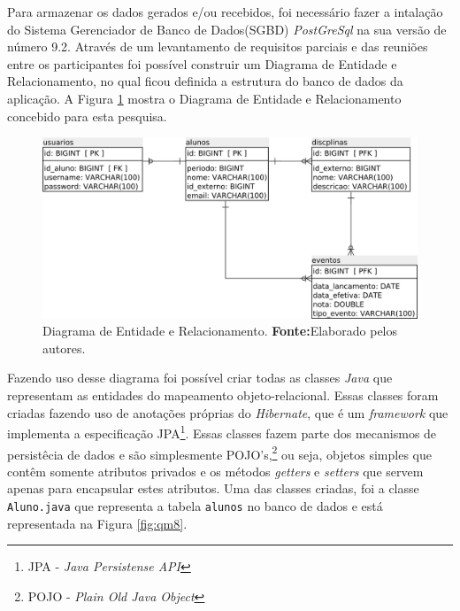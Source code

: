		\par Para armazenar os dados gerados e/ou recebidos, foi necessário fazer a
	intalação do Sistema Gerenciador de Banco de Dados(SGBD) \textit{PostGreSql} na
	sua versão de número 9.2. Através de um levantamento de requisitos parciais e das
	reuniões entre os participantes foi possível construir um Diagrama de Entidade
	e Relacionamento, no qual ficou definida a estrutura do banco de dados da
	aplicação. A Figura \ref{fig:qm7} mostra o Diagrama de Entidade e
	Relacionamento concebido para esta pesquisa.

		\begin{figure}[h!]
			\centerline{\includegraphics[scale=0.4]{./imagens/2_q_metodologico/qm7.png}}
			\caption[Diagrama de Entidade e Relacionamento]{Diagrama de Entidade e
			Relacionamento.
			\textbf{Fonte:}Elaborado pelos autores.}
			\label{fig:qm7}
		\end{figure}

		\par Fazendo uso desse diagrama foi possível criar todas as classes 
	\textit{Java} que representam as entidades do mapeamento objeto-relacional. 
	Essas classes foram criadas fazendo uso de anotações próprias do
	\textit{Hibernate}, que é um \textit{framework} que implementa a especificação
	JPA\footnote{JPA - \textit{Java Persistense API}}. Essas classes fazem parte
	dos mecanismos de persistêcia de dados e são simplesmente POJO's,\footnote{POJO
	- \textit{Plain Old Java Object }} ou seja, objetos simples que contêm somente
	atributos privados e os métodos \textit{getters} e \textit{setters} que servem
	apenas para encapsular estes atributos. Uma das classes criadas, foi a classe
	\texttt{Aluno.java} que representa a tabela \texttt{alunos} no banco de dados e
	está representada na Figura \ref{fig:qm8}.%
	
